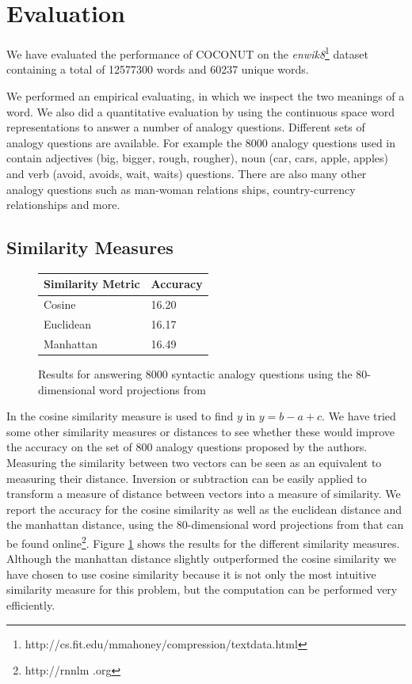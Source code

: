 \documentclass[11pt]{article}
\begin{document}
\section{Evaluation}
We have evaluated the performance of COCONUT on the \textit{enwik8}\footnote{http://cs.fit.edu/mmahoney/compression/textdata.html} dataset containing a total of 12577300 words and 60237 unique words. 

We performed an empirical evaluating, in which we inspect the two meanings of a word. We also did a quantitative evaluation by using the continuous space word representations to answer a number of analogy questions. Different sets of analogy questions are available. For example the 8000 analogy questions used in \cite{Mikolov:13} contain adjectives (big, bigger, rough, rougher), noun (car, cars, apple, apples) and verb (avoid, avoids, wait, waits) questions. There are also many other analogy questions such as man-woman relations ships, country-currency relationships and more.

\subsection{Similarity Measures}
\begin{figure}[H]
\center
    \begin{tabular}{l|l}
    \textbf{Similarity Metric} & \textbf{Accuracy}  \\ \hline
    Cosine            & 16.20     \\ \hline
    Euclidean         & 16.17     \\ \hline
    Manhattan         & 16.49     \\
    \end{tabular}
    \caption{Results for answering 8000 syntactic analogy questions using the 80-dimensional word projections from \cite{Mikolov:13}}
    \label{sims}

\end{figure}

In \cite{Mikolov:13} the cosine similarity measure is used to find $y$ in $y = b - a + c$. We have tried some other similarity measures or distances to see whether these would improve the accuracy on the set of 800 analogy questions proposed by the authors. Measuring the similarity between two vectors can be seen as an equivalent to measuring their distance. Inversion or subtraction can be easily applied to transform a measure of distance between vectors into a measure of similarity. We report the accuracy for the cosine similarity as well as the euclidean distance and the manhattan distance, using the 80-dimensional word projections from \cite{Mikolov:13} that can be found online\footnote{http://rnnlm .org}. Figure \ref{sims} shows the results for the different similarity measures. Although the manhattan distance slightly outperformed the cosine similarity we have chosen to use cosine similarity because it is not only the most intuitive similarity measure for this problem, but the computation can be performed very efficiently. 
\end{document}
